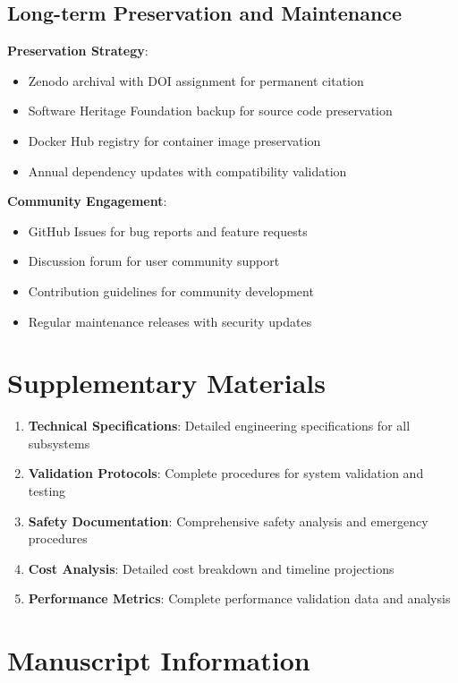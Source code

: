 \documentclass[12pt,a4paper]{article}
\begin{document}
\subsection{Long-term Preservation and Maintenance}

\textbf{Preservation Strategy}:
\begin{itemize}
\item Zenodo archival with DOI assignment for permanent citation
\item Software Heritage Foundation backup for source code preservation
\item Docker Hub registry for container image preservation
\item Annual dependency updates with compatibility validation
\end{itemize}

\textbf{Community Engagement}:
\begin{itemize}
\item GitHub Issues for bug reports and feature requests
\item Discussion forum for user community support
\item Contribution guidelines for community development
\item Regular maintenance releases with security updates
\end{itemize}

\section{Supplementary Materials}

\begin{enumerate}
\item \textbf{Technical Specifications}: Detailed engineering specifications for all subsystems
\item \textbf{Validation Protocols}: Complete procedures for system validation and testing
\item \textbf{Safety Documentation}: Comprehensive safety analysis and emergency procedures
\item \textbf{Cost Analysis}: Detailed cost breakdown and timeline projections
\item \textbf{Performance Metrics}: Complete performance validation data and analysis
\end{enumerate}

\section*{Manuscript Information}
\end{document}
